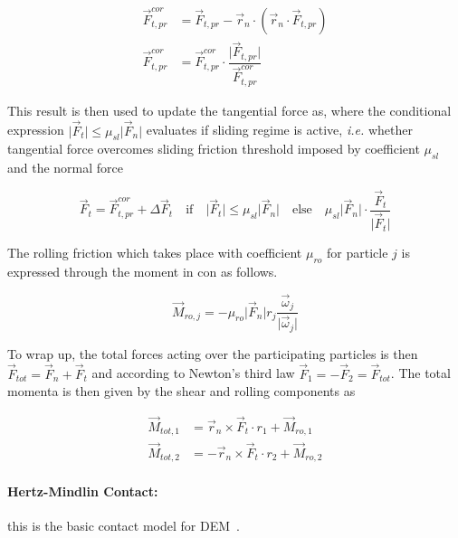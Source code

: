 \begin{equation}
\begin{aligned}
\vec{F}_{t,pr}^{cor} &= \vec{F}_{t,pr}-\vec{r}_n\cdotp\left(\vec{r}_n\cdotp\vec{F}_{t,pr}\right)\\[6pt]
\vec{F}_{t,pr}^{cor} &= \vec{F}_{t,pr}^{cor}\cdotp\dfrac{\vert\vec{F}_{t,pr}\vert}{\vec{F}_{t,pr}^{cor}}
\end{aligned}
\end{equation}

This result is then used to update the tangential force as, where the conditional expression $\vert\vec{F}_{t}\vert\leq\mu_{sl}\vert\vec{F}_{n}\vert$ evaluates if sliding regime is active, \emph{i.e.} whether tangential force overcomes sliding friction threshold imposed by coefficient $\mu_{sl}$ and the normal force

\begin{equation}
\vec{F}_{t} =\vec{F}_{t,pr}^{cor}+\Delta\vec{F}_{t}\quad\text{if}\quad\vert\vec{F}_{t}\vert\leq\mu_{sl}\vert\vec{F}_{n}\vert\quad\text{else}\quad\mu_{sl}\vert\vec{F}_{n}\vert\cdotp\dfrac{\vec{F}_{t}}{\vert\vec{F}_{t}\vert}
\end{equation}

The rolling friction which takes place with coefficient $\mu_{ro}$ for particle $j$ is expressed through the moment in con as follows.

\begin{equation}
\vec{M}_{ro,j} = -\mu_{ro}\vert\vec{F}_{n}\vert{}r_{j}\dfrac{\vec{\omega}_{j}}{\vert\vec{\omega}_{j}\vert}
\end{equation}

To wrap up, the total forces acting over the participating particles is then $\vec{F}_{tot}=\vec{F}_{n}+\vec{F}_{t}$ and according to Newton's third law $\vec{F}_{1}=-\vec{F}_{2}=\vec{F}_{tot}$. The total momenta is then given by the shear and rolling components as

\begin{equation}
\begin{aligned}
\vec{M}_{tot,1} &= \vec{r}_{n}\times\vec{F}_{t}\cdotp{}r_{1} + \vec{M}_{ro,1}\\[6pt]
\vec{M}_{tot,2} &= -\vec{r}_{n}\times\vec{F}_{t}\cdotp{}r_{2} + \vec{M}_{ro,2}
\end{aligned}
\end{equation}

\paragraph{Hertz-Mindlin Contact:} this is the basic contact model for DEM~\cite{Wang2021}.

\endinput
